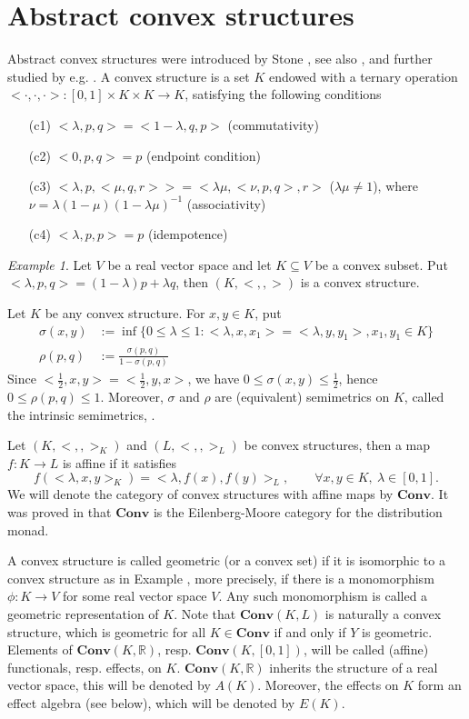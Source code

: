 \documentclass[12pt]{article}
\newcommand{\<}{\langle}
\theoremstyle{remark}
\newtheorem{ex}{Example}
\newcommand{\ct}[1]{\mathbf{#1}}
\begin{document}
\section{Abstract convex structures}

Abstract convex structures were introduced by Stone \cite{stone}, see also \cite{gudder}, and further studied by e.g. \cite{fritz, jacobs}. A convex structure is a set $K$ endowed with a ternary operation $<\cdot,\cdot,\cdot>: [0,1]\times K\times K\to K$, satisfying the following conditions
\begin{enumerate}
\item[(c1)] $<\lambda, p,q> =<1-\lambda,q,p>$ (commutativity)
\item[(c2)] $<0,p,q>=p$ (endpoint condition)
\item[(c3)]  $<\lambda,p,<\mu,q,r>>=<\lambda\mu,<\nu,p,q>,r>$ ($\lambda\mu\neq 1$), where $\nu=\lambda(1-\mu)(1-\lambda\mu)^{-1}$ (associativity)
\item[(c4)] $<\lambda,p,p>=p$ (idempotence)
\end{enumerate}

\begin{ex}\label{ex:geomeric}
Let $V$ be a real vector space and let $K\subseteq V$ be a convex subset. Put $<\lambda,p,q>=(1-\lambda)p+\lambda q$, then $(K,<,,>)$ is a convex structure.
\end{ex}

Let $K$ be any convex structure. For $x,y\in K$, put
\begin{align*}
\sigma(x,y)&:=\inf\{ 0\leq \lambda\leq 1:<\lambda,x,x_1>=<\lambda,y,y_1>, x_1,y_1\in K\}\\
\rho(p,q)&:=\frac{\sigma(p,q)}{1-\sigma(p,q)}
\end{align*}
Since $<\frac{1}{2},x,y>=<\frac{1}{2},y,x>$, we have $0\leq \sigma(x,y)\leq \frac{1}{2}$, hence $0\leq \rho(p,q)\leq 1$. Moreover, $\sigma$ and $\rho$ are (equivalent)  semimetrics on $K$, called the intrinsic semimetrics, \cite{gudder}. 

Let $(K,< , ,>_K)$ and $(L,<, ,>_L)$ be convex structures, then a map $f:K\to L$ is affine if it satisfies
\[
f(<\lambda,x,y>_K)=<\lambda,f(x),f(y)>_L,\qquad \forall x,y\in K,\ \lambda\in [0,1].
\]
We will denote the category of convex structures with affine maps by $\ct{Conv}$. It was proved in \cite{jacobs} that $\ct{Conv}$ is the Eilenberg-Moore category for the distribution monad. 


A convex structure is called geometric (or a convex set) if it is isomorphic to a convex structure as in Example \cite{ex:geomeric}, more precisely, if there is a 
monomorphism $\phi:K\to V$ for some real vector space $V$. Any such monomorphism is called a geometric representation of $K$. Note that $\ct{Conv}(K,L)$ is naturally a convex structure, which is geometric for all $K\in \ct{Conv}$ if and only if $Y$ is geometric. Elements of $\ct{Conv}(K,\mathbb R)$, resp. $\ct{Conv}(K,[0,1])$, will be called (affine) functionals, resp. effects, on $K$. 
$\ct{Conv}(K,\mathbb R)$ inherits the structure of a real vector space, this will be denoted by $A(K)$. Moreover, the effects on $K$ form an effect algebra (see below), which will be denoted by $E(K)$.
 
\end{document}
